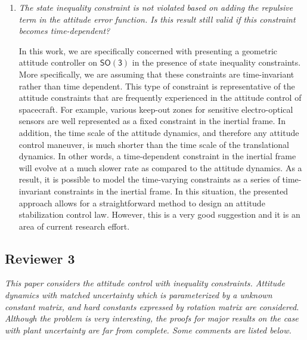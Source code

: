 \documentclass[11pt]{article}
\newcommand{\SO}{\ensuremath{\mathsf{SO(3)}}}
\begin{document}
\begin{enumerate}
\item \textit{The state inequality constraint is not violated based on adding the repulsive term in the attitude error function. Is this result still valid if this constraint becomes time-dependent?}

In this work, we are specifically concerned with presenting a geometric attitude controller on \( \SO \) in the presence of state inequality constraints.
More specifically, we are assuming that these constraints are time-invariant rather than time dependent. 
This type of constraint is representative of the attitude constraints that are frequently experienced in the attitude control of spacecraft. 
For example, various keep-out zones for sensitive electro-optical sensors are well represented as a fixed constraint in the inertial frame. 
In addition, the time scale of the attitude dynamics, and therefore any attitude control maneuver, is much shorter than the time scale of the translational dynamics.
In other words, a time-dependent constraint in the inertial frame will evolve at a much slower rate as compared to the attitude dynamics. 
As a result, it is possible to model the time-varying constraints as a series of time-invariant constraints in the inertial frame. 
In this situation, the presented approach allows for a straightforward method to design an attitude stabilization control law. 
However, this is a very good suggestion and it is an area of current research effort.

\end{enumerate}

\subsection*{Reviewer 3}

\textit{This paper considers the attitude control with inequality constraints. Attitude dynamics with matched uncertainty which is parameterized by a unknown constant matrix, and hard constants expressed by rotation matrix are considered. Although the problem is very interesting, the proofs for major results on the case with plant uncertainty are far from complete. Some comments are listed below.}
\end{document}
